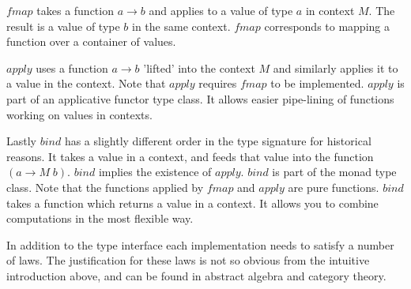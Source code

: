 \documentclass[12pt,fleqn]{article}
\begin{document}
$fmap$ takes a function $a \rightarrow b$ and applies to a value of type $a$ in context $M$. 
The result is a value of type $b$ in the same context.
$fmap$ corresponds to mapping a function over a container of values.

$apply$ uses a function $a \rightarrow b$ 'lifted' into the context $M$ and similarly applies it to a value in the context.
Note that $apply$ requires $fmap$ to be implemented.
$apply$ is part of an applicative functor type class.
It allows easier pipe-lining of functions working on values in contexts.

Lastly $bind$ has a slightly different order in the type signature for historical reasons. 
It takes a value in a context, and feeds that value into the function $(a \rightarrow M\; b)$.
$bind$ implies the existence of $apply$.
$bind$ is part of the monad type class. 
Note that the functions applied by $fmap$ and $apply$ are pure functions. $bind$ takes a function which returns a value in a context.
It allows you to combine computations in the most flexible way.

In addition to the type interface each implementation needs to satisfy a number of laws.
The justification for these laws is not so obvious from the intuitive introduction above, and can be found in abstract algebra and category theory.
\end{document}
